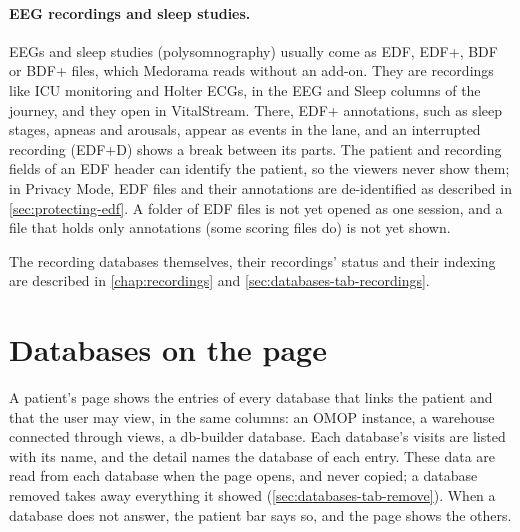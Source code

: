\paragraph{EEG recordings and sleep studies.} EEGs and sleep studies (polysomnography) usually
come as EDF, EDF+, BDF or BDF+ files, which Medorama reads without an add-on. They are
recordings like ICU monitoring and Holter ECGs, in the EEG and Sleep columns of the journey, and
they open in VitalStream. There, EDF+ annotations, such as sleep stages, apneas and arousals,
appear as events in the  lane, and an interrupted recording (EDF+D) shows a
break between its parts. The patient and recording fields of an EDF header can identify the
patient, so the viewers never show them; in Privacy Mode, EDF files and their annotations are
de-identified as described in \cref{sec:protecting-edf}. A folder of EDF files is not yet opened
as one session, and a file that holds only annotations (some scoring files do) is not yet shown.


The recording databases themselves, their recordings' status and their indexing are described
in \cref{chap:recordings} and \cref{sec:databases-tab-recordings}.

\section{Databases on the page}
\label{sec:patients-connected}

A patient's page shows the entries of every database that links the patient and that the user
may view, in the same columns: an OMOP instance, a warehouse connected through views, a
db-builder database. Each database's visits are listed with its name, and the detail names the
database of each entry. These data are read from each database when the page opens, and never
copied; a database removed takes away everything it showed (\cref{sec:databases-tab-remove}).
When a database does not answer, the patient bar says so, and the page shows the others.
